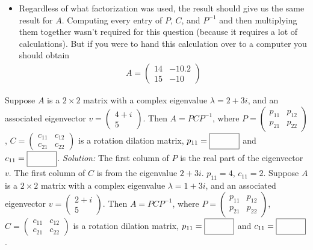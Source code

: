 \begin{parts}
{\begin{itemize}
            \item Regardless of what factorization was used, the result should give us the same result for $A$. Computing every entry of $P$, $C$, and $P^{-1}$ and then multiplying them together wasn't required for this question (because it requires a lot of calculations). But if you were to hand this calculation over to a computer you should obtain
            \begin{align}
                A = \begin{pmatrix} 14&-10.2\\15&-10\end{pmatrix}
            \end{align}
        \end{itemize}   } \fi    
    \fi 
    \ifnum {}
      Suppose $A$ is a $2\times2$ matrix with a complex eigenvalue $\lambda = 2+3i$, and an associated eigenvector $v=\begin{pmatrix} 4+i\\5\end{pmatrix}$. Then $A=PCP^{-1}$, where $P=\begin{pmatrix} p_{11}&p_{12}\\p_{21}&p_{22} \end{pmatrix}$, $C=\begin{pmatrix} c_{11}&c_{12}\\c_{21}&c_{22}\end{pmatrix}$ is a rotation dilation matrix, $p_{11} = \framebox{\strut\hspace{1cm}}$ and $c_{11} = \framebox{\strut\hspace{1cm}}$. 
        \ifnum {} {\color{DarkBlue} \textit{Solution:} The first column of $P$ is the real part of the eigenvector $v$. The first column of $C$ is from the eigenvalue $2+3i$. 
        $p_{11} = 4$, $c_{11} = 2$.  } \fi    
    \fi 
    \ifnum {}
      Suppose $A$ is a $2\times2$ matrix with a complex eigenvalue $\lambda = 1+3i$, and an associated eigenvector $v=\begin{pmatrix} 2+i\\5\end{pmatrix}$. Then $A=PCP^{-1}$, where $P=\begin{pmatrix} p_{11}&p_{12}\\p_{21}&p_{22} \end{pmatrix}$, $C=\begin{pmatrix} c_{11}&c_{12}\\c_{21}&c_{22}\end{pmatrix}$ is a rotation dilation matrix, $p_{11} = \framebox{\strut\hspace{1cm}}$ and $c_{11} = \framebox{\strut\hspace{1cm}}$. 

\end{parts}
